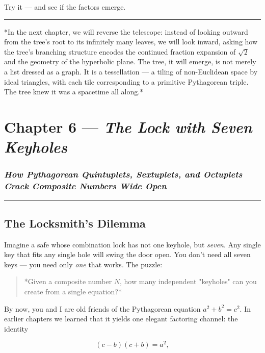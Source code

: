 \documentclass[12pt, letterpaper, openany]{book}
\theoremstyle{definition}
\theoremstyle{remark}
\begin{document}
Try it --- and see if the factors emerge.


\bigskip\noindent\rule{\textwidth}{0.4pt}\bigskip


*In the next chapter, we will reverse the telescope: instead of looking outward from the tree's root to its infinitely many leaves, we will look inward, asking how the tree's branching structure encodes the continued fraction expansion of $\sqrt{2}$ and the geometry of the hyperbolic plane. The tree, it will emerge, is not merely a list dressed as a graph. It is a tessellation --- a tiling of non-Euclidean space by ideal triangles, with each tile corresponding to a primitive Pythagorean triple. The tree knew it was a spacetime all along.*


\clearpage

\chapter{Chapter 6 --- \textit{The Lock with Seven Keyholes}}



\subsection*{\textit{How Pythagorean Quintuplets, Sextuplets, and Octuplets Crack Composite Numbers Wide Open}}



\bigskip\noindent\rule{\textwidth}{0.4pt}\bigskip



\section*{The Locksmith's Dilemma}


Imagine a safe whose combination lock has not one keyhole, but \textit{seven}. Any single key that fits any single hole will swing the door open. You don't need all seven keys --- you need only \textit{one} that works. The puzzle:


\begin{quote}
*Given a composite number $N$, how many independent "keyholes" can you create from a single equation?*
\end{quote}


By now, you and I are old friends of the Pythagorean equation $a^2 + b^2 = c^2$. In earlier chapters we learned that it yields one elegant factoring channel: the identity

\[
(c - b)(c + b) = a^2,
\]
\end{document}
